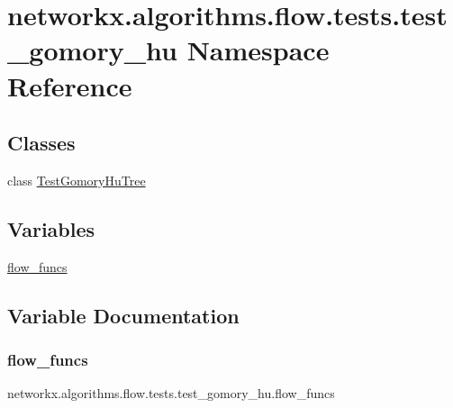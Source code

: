 \hypertarget{namespacenetworkx_1_1algorithms_1_1flow_1_1tests_1_1test__gomory__hu}{}\section{networkx.\+algorithms.\+flow.\+tests.\+test\+\_\+gomory\+\_\+hu Namespace Reference}
\label{namespacenetworkx_1_1algorithms_1_1flow_1_1tests_1_1test__gomory__hu}
\subsection*{Classes}
\begin{DoxyCompactItemize}
\item 
class \hyperlink{classnetworkx_1_1algorithms_1_1flow_1_1tests_1_1test__gomory__hu_1_1TestGomoryHuTree}{Test\+Gomory\+Hu\+Tree}
\end{DoxyCompactItemize}
\subsection*{Variables}
\begin{DoxyCompactItemize}
\item 
\hyperlink{namespacenetworkx_1_1algorithms_1_1flow_1_1tests_1_1test__gomory__hu_abec3aaeb54afb38ccdb09caa310926ba}{flow\+\_\+funcs}
\end{DoxyCompactItemize}


\subsection{Variable Documentation}
\mbox{\label{namespacenetworkx_1_1algorithms_1_1flow_1_1tests_1_1test__gomory__hu_abec3aaeb54afb38ccdb09caa310926ba}} 
\subsubsection{\texorpdfstring{flow\+\_\+funcs}{flow\_funcs}}
{\footnotesize\ttfamily networkx.\+algorithms.\+flow.\+tests.\+test\+\_\+gomory\+\_\+hu.\+flow\+\_\+funcs}

